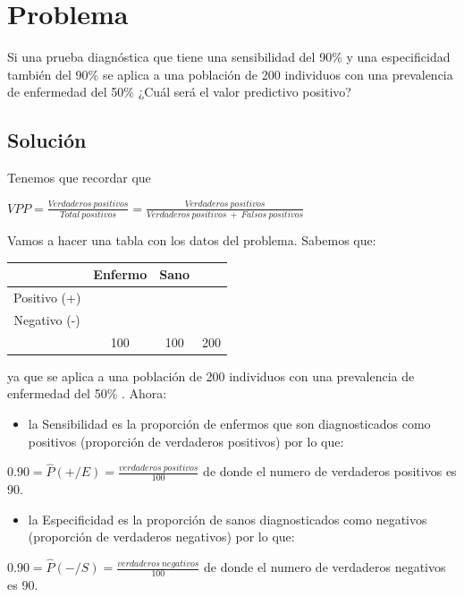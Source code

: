 \documentclass[
]{book}
\providecommand{\tightlist}{%
  \setlength{\itemsep}{0pt}\setlength{\parskip}{0pt}}
\begin{document}
\hypertarget{problema-19}{%
\section{Problema}\label{problema-19}}

Si una prueba diagnóstica que tiene una sensibilidad del 90\% y una especificidad también del 90\% se aplica a una población de 200 individuos con una prevalencia de enfermedad del 50\% ¿Cuál será el valor predictivo positivo?

\hypertarget{soluciuxf3n-15}{%
\subsection{Solución}\label{soluciuxf3n-15}}

Tenemos que recordar que

\(VPP=\frac{Verdaderos ~ positivos}{Total ~ positivos}=\frac{Verdaderos ~ positivos}{Verdaderos ~ positivos ~ + ~ Falsos ~ positivos}\)

Vamos a hacer una tabla con los datos del problema. Sabemos que:

\begin{longtable}[]{@{}cccc@{}}
\toprule
& Enfermo & Sano &\tabularnewline
\midrule
\endhead
Positivo (+) & & &\tabularnewline
Negativo (-) & & &\tabularnewline
& 100 & 100 & 200\tabularnewline
\bottomrule
\end{longtable}

ya que se aplica a una población de 200 individuos con una prevalencia de enfermedad del 50\% . Ahora:

\begin{itemize}
\tightlist
\item
  la Sensibilidad es la proporción de enfermos que son diagnosticados como positivos (proporción de verdaderos positivos) por lo que:
\end{itemize}

\(0.90 = \hat{P}(+/E) = \frac{verdaderos ~ positivos}{100}\) de donde el numero de verdaderos positivos es 90.

\begin{itemize}
\tightlist
\item
  la Especificidad es la proporción de sanos diagnosticados como negativos (proporción de verdaderos negativos) por lo que:
\end{itemize}

\(0.90 = \hat{P}(-/S) = \frac{verdaderos ~ negativos}{100}\) de donde el numero de verdaderos negativos es 90.
\end{document}
